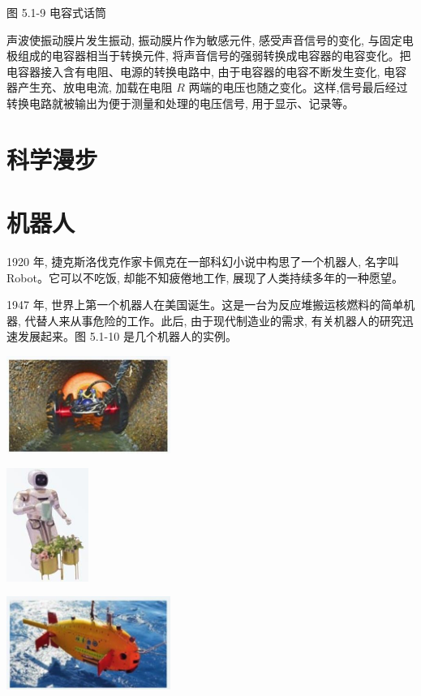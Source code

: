 \documentclass[10pt]{article}
\begin{document}
图 5.1-9 电容式话筒

声波使振动膜片发生振动, 振动膜片作为敏感元件, 感受声音信号的变化, 与固定电极组成的电容器相当于转换元件, 将声音信号的强弱转换成电容器的电容变化。把电容器接入含有电阻、电源的转换电路中, 由于电容器的电容不断发生变化, 电容器产生充、放电电流, 加载在电阻 \(R\) 两端的电压也随之变化。这样,信号最后经过转换电路就被输出为便于测量和处理的电压信号, 用于显示、记录等。

\section*{科学漫步}

\section*{机器人}

1920 年, 捷克斯洛伐克作家卡佩克在一部科幻小说中构思了一个机器人, 名字叫 Robot。它可以不吃饭, 却能不知疲倦地工作, 展现了人类持续多年的一种愿望。

1947 年, 世界上第一个机器人在美国诞生。这是一台为反应堆搬运核燃料的简单机器, 代替人来从事危险的工作。此后, 由于现代制造业的需求, 有关机器人的研究迅速发展起来。图 5.1-10 是几个机器人的实例。

\begin{center}
\includegraphics[max width=0.4\textwidth]{images/01910e72-c5b7-7ed5-a6d4-fb3a5faefc32_101_459599.jpg}
\end{center}

\begin{center}
\includegraphics[max width=0.2\textwidth]{images/01910e72-c5b7-7ed5-a6d4-fb3a5faefc32_101_520849.jpg}
\end{center}

\begin{center}
\includegraphics[max width=0.4\textwidth]{images/01910e72-c5b7-7ed5-a6d4-fb3a5faefc32_101_716859.jpg}
\end{center}
\end{document}
